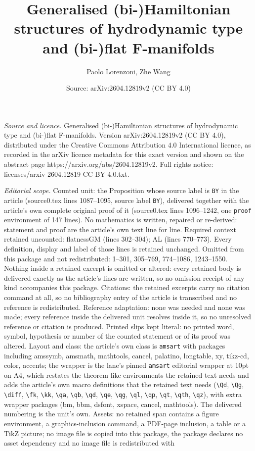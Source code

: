 \documentclass[10pt,a4paper]{amsart}
\title[Generalised (bi-)Hamiltonian structures of hydrodynamic type]{Generalised (bi-)Hamiltonian structures of hydrodynamic type and (bi-)flat F-manifolds}
\author{Paolo Lorenzoni, Zhe Wang}
\date{Source: arXiv:2604.12819v2 (CC BY 4.0)}
\begin{document}
\maketitle

\noindent\emph{Source and licence.} Generalised (bi-)Hamiltonian structures of hydrodynamic type and (bi-)flat F-manifolds. Version arXiv:2604.12819v2 (CC BY 4.0), distributed under the Creative Commons Attribution 4.0 International licence, as recorded in the arXiv licence metadata for this exact version and shown on the abstract page https://arxiv.org/abs/2604.12819v2. Full rights notice: licenses/arxiv-2604.12819-CC-BY-4.0.txt.\par\smallskip

\noindent\textit{Editorial scope.} Counted unit: the Proposition whose source label is \texttt{BY} in the article (source0.tex lines 1087--1095, source label \texttt{BY}), delivered together with the article's own complete original proof of it (source0.tex lines 1096--1242, one \texttt{proof} environment of 147 lines). No mathematics is written, repaired or re-derived: statement and proof are the article's own text line for line. Required context retained uncounted: flatnessGM (lines 302--304); AL (lines 770--773). Every definition, display and label of those lines is retained unchanged. Omitted from this package and not redistributed: 1--301, 305--769, 774--1086, 1243--1550. Nothing inside a retained excerpt is omitted or altered: every retained body is delivered exactly as the article's lines are written, so no omission receipt of any kind accompanies this package. Citations: the retained excerpts carry no citation command at all, so no bibliography entry of the article is transcribed and no reference is redistributed. Reference adaptation: none was needed and none was made; every reference inside the delivered unit resolves inside it, so no unresolved reference or citation is produced. Printed slips kept literal: no printed word, symbol, hypothesis or number of the counted statement or of its proof was altered. Layout and class: the article's own class is \texttt{amsart} with packages including amssymb, amsmath, mathtools, cancel, palatino, longtable, xy, tikz-cd, color, accents; the wrapper is the lane's pinned \texttt{amsart} editorial wrapper at 10pt on A4, which restates the theorem-like environments the retained text needs and adds the article's own macro definitions that the retained text needs (\texttt{\textbackslash Qd}, \texttt{\textbackslash Qg}, \texttt{\textbackslash diff}, \texttt{\textbackslash fk}, \texttt{\textbackslash kk}, \texttt{\textbackslash qa}, \texttt{\textbackslash qb}, \texttt{\textbackslash qd}, \texttt{\textbackslash qe}, \texttt{\textbackslash qg}, \texttt{\textbackslash ql}, \texttt{\textbackslash qp}, \texttt{\textbackslash qt}, \texttt{\textbackslash qth}, \texttt{\textbackslash qz}), with extra wrapper packages (bm, bbm, dsfont, xspace, cancel, mathtools). The delivered numbering is the unit's own. Assets: no retained span contains a figure environment, a graphics-inclusion command, a PDF-page inclusion, a table or a TikZ picture; no image file is copied into this package, the package declares no asset dependency and no image file is redistributed with 
\end{document}
